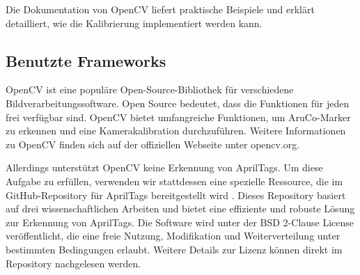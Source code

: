 Die Dokumentation von OpenCV \cite{opencv_calibration_tutorial} liefert praktische 
Beispiele und erklärt detailliert, wie die Kalibrierung implementiert werden 
kann.


\subsection{Benutzte Frameworks}
OpenCV ist eine populäre Open-Source-Bibliothek für verschiedene Bildverarbeitungssoftware.
Open Source bedeutet, dass die Funktionen für jeden frei verfügbar sind. OpenCV bietet 
umfangreiche Funktionen, um AruCo-Marker zu erkennen und eine Kamerakalibration durchzuführen.
Weitere Informationen zu OpenCV finden sich auf der offiziellen Webseite unter opencv.org.

Allerdings unterstützt OpenCV keine Erkennung von AprilTags. Um diese Aufgabe zu erfüllen, verwenden 
wir stattdessen eine spezielle Ressource, die im GitHub-Repository für AprilTags bereitgestellt 
wird \cite{apriltag_github}. Dieses Repository basiert auf drei wissenschaftlichen Arbeiten 
\cite{olson2011tags} \cite{wang2016iros} \cite{krogius2019iros} und bietet eine effiziente 
und robuste Lösung zur Erkennung von AprilTags. Die Software wird unter der BSD 2-Clause License 
veröffentlicht, die eine freie Nutzung, Modifikation und Weiterverteilung unter bestimmten Bedingungen 
erlaubt. Weitere Details zur Lizenz können direkt im Repository nachgelesen werden.